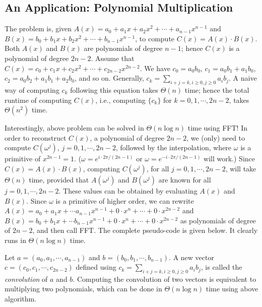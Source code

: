\subsection*{An Application: Polynomial Multiplication}

The problem is, given $A(x) = a_0 + a_1x + a_2x^2 + \cdots + a_{n-1} x^{n-1}$ and
$B(x) = b_0 + b_1x + b_2x^2 + \cdots + b_{n-1}x^{n-1}$, to compute $C(x) = A(x) \cdot B(x)$.
Both $A(x)$ and $B(x)$ are polynomials of degree $n-1$; hence $C(x)$ is a polynomial of degree $2n-2$.
Assume that $C(x) = c_0 + c_1x + c_2x^2 + \cdots + c_{2n-2}x^{2n-2}$. 
We have $c_0 = a_0b_0$, $c_1 = a_0b_1 + a_1b_0$, $c_2 = a_0b_2+ a_1b_1 + a_2b_0$, and so on.
Generally, $c_k = \sum_{i + j = k, i \ge 0, j\ge 0} a_ib_j$.
A naive way of computing $c_k$ following this equation takes $\Theta(n)$ time; hence
the total runtime of computing $C(x)$, i.e., computing $\{c_k\}$ for $k=0, 1, \cdots, 2n-2$, takes $\Theta(n^2)$ time.

Interestingly, above problem can be solved in $\Theta(n\log n)$ time using FFT!
In order to reconstruct $C(x)$, a polynomial of degree $2n-2$, we (only) need to
compute $C(\omega^j)$, $j = 0, 1, \cdots, 2n-2$, followed by the interpolation,
where $\omega$ is a primitive of $x^{2n-1} = 1$.
($\omega = e^{i\cdot 2\pi / (2n-1)}$ or $\omega = e^{-i\cdot 2\pi / (2n-1)}$ will work.)
Since $C(x) = A(x)\cdot B(x)$, computing $C(\omega^j)$, for all $j=0, 1, \cdots, 2n-2$, will
take $\Theta(n)$ time, provided that $A(\omega^j)$ and $B(\omega^j)$ are known for all $j=0, 1, \cdots, 2n-2$.
These values can be obtained by evaluating $A(x)$ and $B(x)$. Since $\omega$ is a primitive of higher order,
we can rewrite $A(x) = a_0 + a_1x + \cdots a_{n-1}x^{n-1} + 0\cdot x^n + \cdots + 0\cdot x^{2n-2}$ and
$B(x) = b_0 + b_1x + \cdots b_{n-1}x^{n-1} + 0\cdot x^n + \cdots + 0\cdot x^{2n-2}$ as polynomials of degree of $2n-2$,
and then call FFT.  The complete pseudo-code is given below. It clearly runs in $\Theta(n\log n)$ time.

\begin{algorithmblock}[0.8\textwidth]
        \xxx
        \xxx
        \xxx
        \xxx
        \xxx
        \xxx
        \xxx
        \xxx
        \xxx
\end{algorithmblock}

Let $a=(a_0, a_1, \cdots, a_{n-1})$ and $b=(b_0, b_1, \cdots, b_{n-1})$.
A new vector $c = (c_0, c_1, \cdots, c_{2n-2})$ defined using $c_k = \sum_{i + j = k, i \ge 0, j \ge 0} a_ib_j$,
is called the \emph{convolution} of $a$ and $b$.  Computing the convolution of two vectors
is equivalent to multiplying two polynomials, which can be done in $\Theta(n\log n)$ time using above algorithm.
